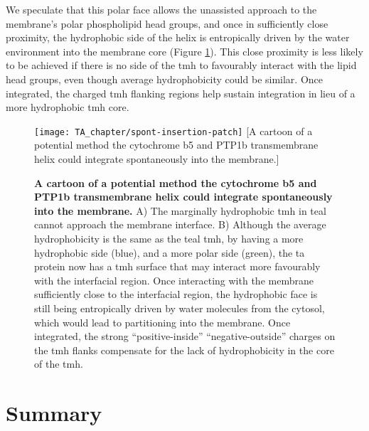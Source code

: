 We speculate that this polar face allows the unassisted approach to the membrane's polar phospholipid head groups, and once in sufficiently close proximity, the hydrophobic side of the helix is entropically driven by the water environment into the membrane core (Figure \ref{fig:spont-insertion-patch}).
This close proximity is less likely to be achieved if there is no side of the \gls{tmh} to favourably interact with the lipid head groups, even though average hydrophobicity could be similar.
Once integrated, the charged \gls{tmh} flanking regions help sustain integration in lieu of a more hydrophobic \gls{tmh} core.

\begin{figure}[!ht]
\centering
\texttt{[image: TA\_chapter/spont-insertion-patch]}
        [A cartoon of a potential method the cytochrome b5 and PTP1b transmembrane helix could integrate spontaneously into the membrane.]{\textbf{A cartoon of a potential method the cytochrome b5 and PTP1b transmembrane helix could integrate spontaneously into the membrane.}
        A) The marginally hydrophobic \gls{tmh} in teal cannot approach the membrane interface.
        B) Although the average hydrophobicity is the same as the teal \gls{tmh}, by having a more hydrophobic side (blue), and a more polar side (green), the \gls{ta} protein now has a \gls{tmh} surface that may interact more favourably with the interfacial region.
        Once interacting with the membrane sufficiently close to the interfacial region, the hydrophobic face is still being entropically driven by water molecules from the cytosol, which would lead to partitioning into the membrane.
        Once integrated, the strong ``positive\--inside'' ``negative\--outside'' charges on the \gls{tmh} flanks compensate for the lack of hydrophobicity in the core of the \gls{tmh}.

}

\label{fig:spont-insertion-patch}
\end{figure}

\section{Summary}

